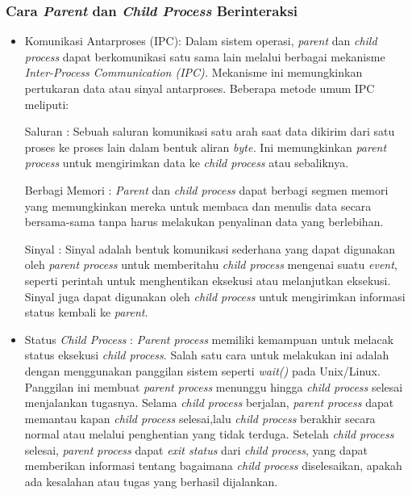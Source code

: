 \documentclass[12pt]{article}
\begin{document}
\subsubsection{Cara \textit{Parent} dan \textit{Child Process} Berinteraksi}

\begin{itemize}
    \item {Komunikasi Antarproses (IPC):} Dalam sistem operasi, \textit{parent} dan \textit{child process} dapat berkomunikasi satu sama lain melalui berbagai mekanisme \textit{Inter-Process Communication (IPC).} Mekanisme ini memungkinkan pertukaran data atau sinyal antarproses. Beberapa metode umum IPC meliputi:

    
    {Saluran :} Sebuah saluran komunikasi satu arah saat data dikirim dari satu proses ke proses lain dalam bentuk aliran \textit{byte.} Ini memungkinkan \textit{parent process} untuk mengirimkan data ke \textit{child process} atau sebaliknya.
    
    {Berbagi Memori :} \textit{Parent} dan \textit{child process} dapat berbagi segmen memori yang memungkinkan mereka untuk membaca dan menulis data secara bersama-sama tanpa harus melakukan penyalinan data yang berlebihan.
    
    {Sinyal :} Sinyal adalah bentuk komunikasi sederhana yang dapat digunakan oleh \textit{parent process} untuk memberitahu \textit{child process} mengenai suatu \textit{event}, seperti perintah untuk menghentikan eksekusi atau melanjutkan eksekusi. Sinyal juga dapat digunakan oleh \textit{child process} untuk mengirimkan informasi status kembali ke \textit{parent}.
    
    \item {Status \textit{Child Process} :} \textit{Parent process} memiliki kemampuan untuk melacak status eksekusi \textit{child process}. Salah satu cara untuk melakukan ini adalah dengan menggunakan panggilan sistem seperti \textit{wait()} pada Unix/Linux. Panggilan ini membuat \textit{parent process} menunggu hingga \textit{child process} selesai menjalankan tugasnya. Selama \textit{child process} berjalan, \textit{parent process} dapat memantau kapan \textit{child process} selesai,lalu \textit{child process} berakhir secara normal atau melalui penghentian yang tidak terduga. Setelah \textit{child process} selesai, \textit{parent process} dapat \textit{exit status} dari \textit{child process}, yang dapat memberikan informasi tentang bagaimana \textit{child process} diselesaikan, apakah ada kesalahan atau tugas yang berhasil dijalankan.
    

\end{itemize}
\end{document}

